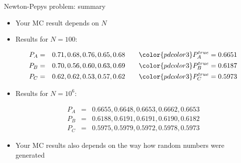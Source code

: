 \begin{slide}[toc=]{Newton-Pepys problem: summary}
\null\vfill

  \begin{itemize}
    \item Your MC result depends on $N$
    \item Results for $N = 100$:
    
    \begin{eqnarray*}
      P_A & = & 0.71, 0.68, 0.76, 0.65, 0.68 \hspace{20pt}{\color{pdcolor3}P_A^{true} = 0.6651} \\
      P_B & = & 0.70, 0.56, 0.60, 0.63, 0.69 \hspace{20pt}{\color{pdcolor3}P_B^{true} = 0.6187}\\
      P_C & = & 0.62, 0.62, 0.53, 0.57, 0.62 \hspace{20pt}{\color{pdcolor3}P_C^{true} = 0.5973}
    \end{eqnarray*}
    
    \item Results for $N = 10^6$:
    
    \begin{eqnarray*}
      P_A & = & 0.6655, 0.6648, 0.6653, 0.6662, 0.6653 \\
      P_B & = & 0.6188, 0.6191, 0.6191, 0.6190, 0.6182 \\
      P_C & = & 0.5975, 0.5979, 0.5972, 0.5978, 0.5973
    \end{eqnarray*}
    
    \item Your MC results also depends on the way how random numbers were generated
    
  \end{itemize}

\vfill\null
\end{slide}

